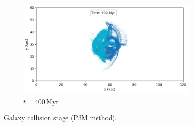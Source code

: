 \begin{figure}[htp]
    \begin{subfigure}[b]{0.8\textwidth}
        \centering
        \includegraphics[width=\textwidth]{chapters/results/img/p3m-collision/400myr.png}
        \caption{$t=400\,\text{Myr}$}
        \label{fig:collision-p3m-sub3}
    \end{subfigure}

    \caption{Galaxy collision stage (P3M method).}
    \label{fig:collision-p3m}
\end{figure}


